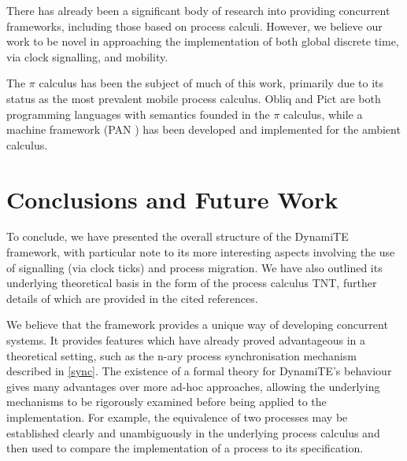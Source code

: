 \documentclass{acm_proc_article-sp}
\begin{document}
There has already been a significant body of research into providing
concurrent frameworks, including those based on process calculi.
However, we believe our work to be novel in approaching the
implementation of both global discrete time, via clock signalling, and
mobility.

The $\pi$ calculus has been the subject of much of this work, primarily
due to its status as the most prevalent mobile process calculus.  Obliq
\cite{obliq} and Pict \cite{daveturner:phd} are both programming
languages with semantics founded in the $\pi$ calculus, while a machine
framework (PAN \cite{sangiorgi:safeambientsmachine}) has been developed
and implemented for the ambient calculus.

\section{Conclusions and Future Work}

To conclude, we have presented the overall structure of the DynamiTE
framework, with particular note to its more interesting aspects
involving the use of signalling (via clock ticks) and process
migration.  We have also outlined its underlying theoretical basis in
the form of the process calculus TNT, further details of which are
provided in the cited references.

We believe that the framework provides a unique way of developing
concurrent systems.  It provides features which have already proved
advantageous in a theoretical setting, such as the n-ary process
synchronisation mechanism described in \ref{sync}.  The existence of a
formal theory for DynamiTE's behaviour gives many advantages over more
ad-hoc approaches, allowing the underlying mechanisms to be rigorously
examined before being applied to the implementation.  For example, the
equivalence of two processes may be established clearly and
unambiguously in the underlying process calculus and then used to
compare the implementation of a process to its specification.
\end{document}
